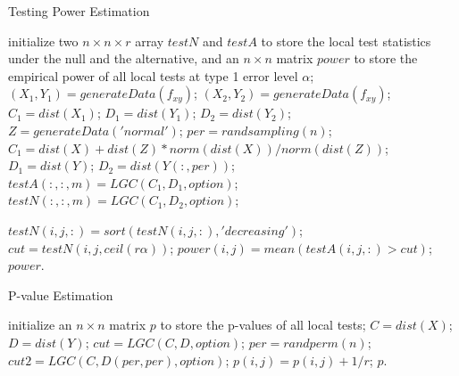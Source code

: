 \documentclass[11pt]{article}
\begin{document}
\begin{algorithm}
\caption{Testing Power Estimation}
\label{algPower}
\begin{algorithmic}
\State initialize two $n \times n \times r$ array $testN$ and $testA$ to store the local test statistics under the null and the alternative, and an $n \times n$ matrix $power$ to store the empirical power of all local tests at type 1 error level $\alpha$;
\State $(X_{1},Y_{1})=generateData(f_{xy})$; 
\State $(X_{2},Y_{2})=generateData(f_{xy})$; 
\State $C_{1}=dist(X_{1})$; $D_{1}=dist(Y_{1})$; $D_{2}=dist(Y_{2})$;
\Else
\State $Z=generateData('normal')$;
\State $per=randsampling(n)$; 
\State $C_{1}=dist(X)+dist(Z)*norm(dist(X))/norm(dist(Z))$; 
\State $D_{1}=dist(Y)$; $D_{2}=dist(Y(:,per))$;
\EndIf
\State $testA(:,:,m)=LGC(C_{1},D_{1},option)$; $testN(:,:,m)=LGC(C_{1},D_{2},option)$;
\EndFor

\State $testN(i,j,:)=sort(testN(i,j,:),'decreasing')$; 
\State $cut=testN(i,j,ceil(r\alpha))$; 
\State $power(i,j)=mean(testA(i,j,:)>cut)$; 
\EndFor
\EndFor
\State \Return $power$.
\EndFunction
\end{algorithmic}
\end{algorithm}

\begin{algorithm}
\caption{P-value Estimation}
\label{algPerm}
\begin{algorithmic}
\State initialize an $n \times n$ matrix $p$ to store the p-values of all local tests;
\State $C=dist(X)$; $D=dist(Y)$; 
\State $cut=LGC(C,D,option)$; 
\State $per=randperm(n)$; 
\State $cut2=LGC(C,D(per,per),option)$; 
\State $p(i,j)=p(i,j)+1/r$;
\EndIf
\EndFor
\EndFor
\EndFor
\State \Return $p$.
\EndFunction
\end{algorithmic}
\end{algorithm}
\end{document}
